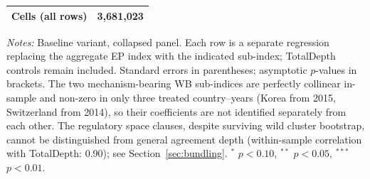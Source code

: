 \begin{table}[htbp]
\begin{threeparttable}
\begin{tabular}{lcc}
\midrule
Cells (all rows) & \multicolumn{2}{c}{3,681,023} \\
\bottomrule
\end{tabular}
\begin{tablenotes}[flushleft]\footnotesize
\item \emph{Notes:} Baseline variant, collapsed panel. Each row is a separate regression replacing the aggregate EP index with the indicated sub-index; TotalDepth controls remain included. Standard errors in parentheses; asymptotic $p$-values in brackets. The two mechanism-bearing WB sub-indices are perfectly collinear in-sample and non-zero in only three treated country--years (Korea from 2015, Switzerland from 2014), so their coefficients are not identified separately from each other. The regulatory space clauses, despite surviving wild cluster bootstrap, cannot be distinguished from general agreement depth (within-sample correlation with TotalDepth: 0.90); see Section~\ref{sec:bundling}. $^{*}$ $p<0.10$, $^{**}$ $p<0.05$, $^{***}$ $p<0.01$.
\end{tablenotes}
\end{threeparttable}
\end{table}

